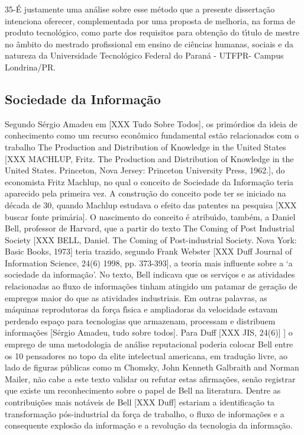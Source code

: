 \documentclass[
12pt,		%
openright,	%
twoside,  %
a4paper,			%
chapter=TITLE,		%
english,			%
french,				%
spanish,			%
brazil				%
]{USPSC-classe/USPSC}
\begin{document}
35-\'E justamente uma an\'alise sobre esse m\'etodo que a presente disserta\c{c}\~ao intenciona oferecer, complementada por uma proposta de melhoria, na forma de produto tecnol\'ogico, como parte dos requisitos para obten\c{c}\~ao do t\'{\i}tulo de mestre no \^ambito do mestrado profissional em ensino de ci\^encias humanas, sociais e da natureza da Universidade  Tecnol\'ogico  Federal do Paran\'a - UTFPR- Campus Londrina/PR.


\subsection[Sociedade da Informa\c{c}\~ao]{Sociedade da Informa\c{c}\~ao}\label{Sociedade da Informa\c{c}\~ao}
Segundo S\'ergio Amadeu em [XXX Tudo Sobre Todos], os prim\'ordios da ideia de conhecimento como um recurso econ\^omico fundamental est\~ao relacionados com o trabalho \textquotedbl The Production and Distribution of Knowledge in the United States [XXX MACHLUP, Fritz. The Production and Distribution of Knowledge in the United States. Princeton, Nova Jersey: Princeton University Press, 1962.], do economista Fritz Machlup, no qual o conceito de Sociedade da Informa\c{c}\~ao teria aparecido pela primeira vez. A constru\c{c}\~ao do conceito pode ter se iniciado na d\'ecada de 30, quando Machlup estudava o efeito das patentes na pesquisa [XXX buscar fonte prim\'aria]. O nascimento do conceito \'e atribu\'{\i}do, tamb\'em, a Daniel Bell, professor de Harvard, que a partir do texto \textquotedbl The Coming of Post Industrial Society [XXX BELL, Daniel. The Coming of Post-industrial Society. Nova York: Basic Books, 1973] teria trazido, segundo Frank Webster [XXX Duff Journal of Information Science, 24(6) 1998, pp. 373-393], \textquotedbl a teoria mais influente sobre a ‘a sociedade da informa\c{c}\~ao’. No texto, Bell indicava que os servi\c{c}os e as atividades relacionadas ao fluxo de informa\c{c}\~oes tinham atingido um patamar de gera\c{c}\~ao de empregos maior do que as atividades industriais. Em outras palavras, \textquotedbl as m\'aquinas reprodutoras da for\c{c}a f\'{\i}sica e ampliadoras da velocidade estavam perdendo espa\c{c}o para tecnologias que armazenam, processam e distribuem informa\c{c}\~oes [S\'ergio Amadeu, tudo sobre todos]. Para Duff [XXX JIS, 24(6)] ] o emprego de uma metodologia de an\'alise \textquotedbl reputacional poderia colocar Bell entre os 10 pensadores no topo da elite intelectual americana, em tradu\c{c}\~ao livre, \textquotedbl ao lado de figuras p\'ublicas como m Chomsky, John Kenneth Galbraith and Norman Mailer, n\~ao cabe a este texto validar ou refutar estas afirma\c{c}\~oes, sen\~ao registrar que existe um reconhecimento sobre o papel de Bell na literatura. Dentre as contribui\c{c}\~oes mais not\'aveis de Bell [XXX Duff] estariam a identifica\c{c}\~ao ta transforma\c{c}\~ao p\'os-industrial da for\c{c}a de trabalho, o fluxo de informa\c{c}\~oes e a consequente \textquotedbl explos\~ao da informa\c{c}\~ao e a \textquotedbl revolu\c{c}\~ao da tecnologia da informa\c{c}\~ao. 
\end{document}
